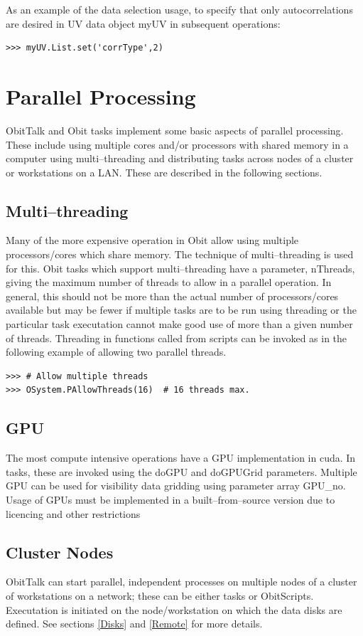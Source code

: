 \documentclass[11pt]{report}
\begin{document}
As an example of the data selection usage, to specify that only
autocorrelations are desired in UV data object myUV in subsequent
operations: 
\begin{verbatim}
>>> myUV.List.set('corrType',2)
\end{verbatim}

\section{Parallel Processing}
   ObitTalk and Obit tasks implement some basic aspects of parallel
processing.  
These include using multiple cores and/or processors with shared
memory in a computer using multi--threading and distributing tasks
across nodes of a cluster or workstations on a LAN.
These are described in the following sections.

\subsection{Multi--threading}
Many of the more expensive operation in Obit allow using multiple
processors/cores which share memory.
The technique of multi--threading is used for this.
Obit tasks which support multi--threading have a parameter, nThreads,
giving the maximum number of threads to allow in a parallel operation.
In general, this should not be more than the actual number of
processors/cores available but may be fewer if multiple tasks are to
be run using threading or the particular task executation cannot make
good use of more than a given number of threads.
Threading in functions called from scripts can be invoked as in the
following example of allowing two parallel threads.
\begin{verbatim}
>>> # Allow multiple threads
>>> OSystem.PAllowThreads(16)  # 16 threads max.
\end{verbatim}

\subsection{GPU}
The most compute intensive operations have a GPU implementation in
cuda.
In tasks, these are invoked using the doGPU and doGPUGrid parameters.
Multiple GPU can be used for visibility data gridding using parameter
array GPU\_no.
Usage of GPUs must be implemented in a built--from--source version due
to licencing and other restrictions

\subsection{Cluster Nodes}
ObitTalk can start parallel, independent processes on multiple nodes
of a cluster of workstations on a network; these can be either tasks or
ObitScripts. 
Executation is initiated on the node/workstation on which the data
disks are defined.
See sections \ref{Disks} and \ref{Remote} for more details.
\end{document}
